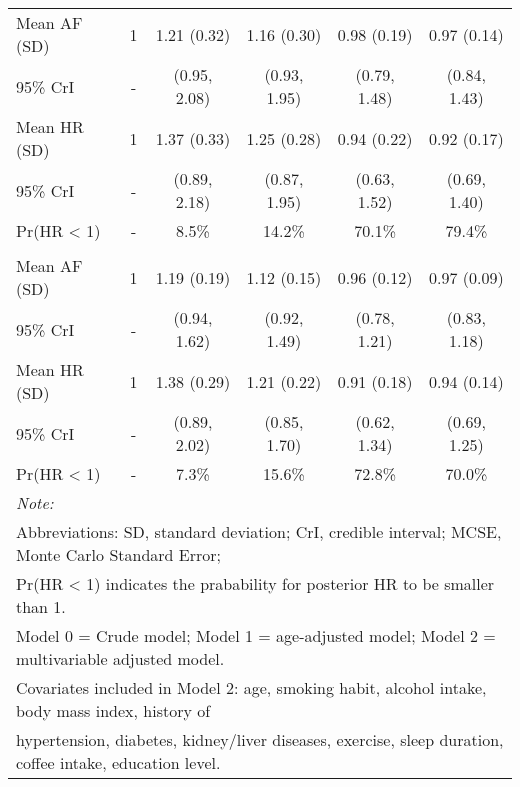 \documentclass[nutrients,article,submitted,moreauthors,pdftex]{mdpi}
\begin{document}
\begin{table}[H]
{\begin{tabular}[t]{lccccc}
\rowcolor{gray!6}  \hspace{1em}Mean AF (SD) & 1 & 1.21 (0.32) & 1.16 (0.30) & 0.98 (0.19) & 0.97 (0.14)\\
\hspace{1em}95\% CrI & - & (0.95, 2.08) & (0.93, 1.95) & (0.79, 1.48) & (0.84, 1.43)\\
\rowcolor{gray!6}  \hspace{1em}Mean HR (SD) & 1 & 1.37 (0.33) & 1.25 (0.28) & 0.94 (0.22) & 0.92 (0.17)\\
\hspace{1em}95\% CrI & - & (0.89, 2.18) & (0.87, 1.95) & (0.63, 1.52) & (0.69, 1.40)\\
\rowcolor{gray!6}  \hspace{1em}Pr(HR < 1) & - & 8.5\% & 14.2\% & 70.1\% & 79.4\%\\
\addlinespace[0.3em]
\multicolumn{6}{l}{\textbf{Model 2}}\\
\hspace{1em}Mean AF (SD) & 1 & 1.19 (0.19) & 1.12 (0.15) & 0.96 (0.12) & 0.97 (0.09)\\
\rowcolor{gray!6}  \hspace{1em}95\% CrI & - & (0.94, 1.62) & (0.92, 1.49) & (0.78, 1.21) & (0.83, 1.18)\\
\hspace{1em}Mean HR (SD) & 1 & 1.38 (0.29) & 1.21 (0.22) & 0.91 (0.18) & 0.94 (0.14)\\
\rowcolor{gray!6}  \hspace{1em}95\% CrI & - & (0.89, 2.02) & (0.85, 1.70) & (0.62, 1.34) & (0.69, 1.25)\\
\hspace{1em}Pr(HR < 1) & - & 7.3\% & 15.6\% & 72.8\% & 70.0\%\\
\bottomrule
\multicolumn{6}{l}{\textit{Note: }}\\
\multicolumn{6}{l}{Abbreviations: SD, standard deviation; CrI, credible interval; MCSE, Monte Carlo Standard Error;}\\
\multicolumn{6}{l}{ Pr(HR < 1) indicates the prabability for posterior HR to be smaller than 1.}\\
\multicolumn{6}{l}{Model 0 = Crude model; Model 1 = age-adjusted model; Model 2 = multivariable adjusted model.}\\
\multicolumn{6}{l}{Covariates included in Model 2: age, smoking habit, alcohol intake, body mass index, history of}\\
\multicolumn{6}{l}{hypertension, diabetes, kidney/liver diseases, exercise, sleep duration, coffee intake, education level.}\\
\end{tabular}}
\end{table}
\end{document}

